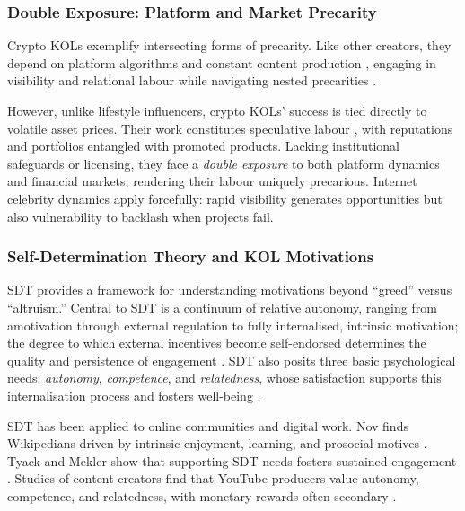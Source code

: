 \subsubsection{Double Exposure: Platform and Market Precarity}

Crypto KOLs exemplify intersecting forms of precarity. Like other creators, they depend on platform algorithms and constant content production \cite{DuffyPlatformPractices2019,CotterVisibilityGame2019}, engaging in visibility and relational labour \cite{AbidinVisibility2016,BaymPlaying2018} while navigating nested precarities \cite{DuffyNestedPrecarities2021}.

However, unlike lifestyle influencers, crypto KOLs' success is tied directly to volatile asset prices. Their work constitutes speculative labour \cite{AlacovskaSpeculativeLabour2024}, with reputations and portfolios entangled with promoted products. Lacking institutional safeguards or licensing, they face a \emph{double exposure} to both platform dynamics and financial markets, rendering their labour uniquely precarious. Internet celebrity dynamics \cite{AbidinInternetCelebrity2018} apply forcefully: rapid visibility generates opportunities but also vulnerability to backlash when projects fail.

\subsubsection{Self-Determination Theory and KOL Motivations}

SDT provides a framework for understanding motivations beyond ``greed'' versus ``altruism.'' Central to SDT is a continuum of relative autonomy, ranging from amotivation through external regulation to fully internalised, intrinsic motivation; the degree to which external incentives become self-endorsed determines the quality and persistence of engagement \cite{RyanDeci2000}. SDT also posits three basic psychological needs: \emph{autonomy}, \emph{competence}, and \emph{relatedness}, whose satisfaction supports this internalisation process and fosters well-being \cite{DeciRyan1985,RyanDeci2000}.

SDT has been applied to online communities and digital work. Nov finds Wikipedians driven by intrinsic enjoyment, learning, and prosocial motives \cite{NovMotivatesWikipedians2007}. Tyack and Mekler show that supporting SDT needs fosters sustained engagement \cite{TyackMeklerSDT2020}. Studies of content creators find that YouTube producers value autonomy, competence, and relatedness, with monetary rewards often secondary \cite{LiuAnxietyCommunities2021,torhonen2019}.

